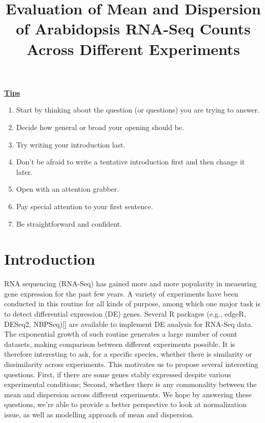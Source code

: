 \documentclass[paper=a4, fontsize=12.5pt]{scrartcl} %
\title{Evaluation of Mean and Dispersion of Arabidopsis RNA-Seq Counts Across Different Experiments}
\date{} %
\numberwithin{equation}{section} %
\numberwithin{figure}{section} %
\numberwithin{table}{section} %
\begin{document}
\maketitle

\textbf{\href{http://writingcenter.unc.edu/handouts/introductions/}{Tips}}
\begin{enumerate}
\item Start by thinking about the question (or questions) you are trying to answer.
\item Decide how general or broad your opening should be.
\item Try writing your introduction last.
\item Don't be afraid to write a tentative introduction first and then change it later.
\item Open with an attention grabber. 
\item Pay special attention to your first sentence. 
\item Be straightforward and confident.
\end{enumerate}

\section{Introduction}
RNA sequencing (RNA-Seq) has gained more and more popularity in measuring gene  expression for the past few years. A variety of experiments  have been conducted in this routine for all kinds of purpose, among which one major task is to detect differential expression (DE) genes. Several R packages (e.g., edgeR, DESeq2, NBPSeq)[{\color{green}{reference needed}}] are available to implement DE analysis for RNA-Seq data. The exponential growth of such routine generates a large number of count datasets, making comparison between different experiments possible. It is therefore interesting to ask, for a specific species, whether there is similarity or dissimilarity across experiments. This motivates us to propose several interesting questions. First, if there are some genes stably expressed despite various experimental conditions; Second, whether there is any commonality between the mean and dispersion across different experiments. We hope by answering these questions, we're able to provide a better perspective to look at normalization issue, as well as modelling approach of mean and dispersion. \\
\end{document}
